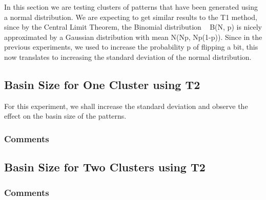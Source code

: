 In this section we are testing clusters of patterns that have been generated using a normal distribution. We are expecting to get similar results to the T1 method, since by the Central Limit Theorem, the Binomial distribution ~ B(N, p) is nicely approximated by a Gaussian distribution with mean N(Np, Np(1-p)). Since in the previous experiments, we used to increase the probability p of flipping a bit, this now translates to increasing the standard deviation of the normal distribution.


\subsection{Basin Size for One Cluster using T2}

For this experiment, we shall increase the standard deviation and observe the effect on the basin size of the patterns.


\subsubsection{Comments}

\subsection{Basin Size for Two Clusters using T2}

\subsubsection{Comments}
\\





\let\psuper\undefined
\let\prandom\undefined
